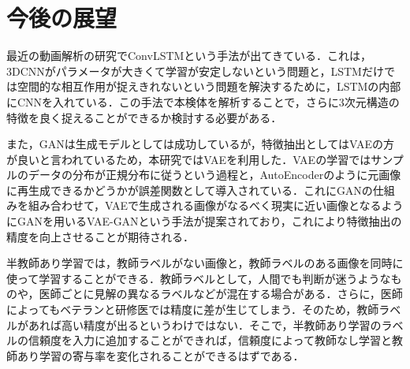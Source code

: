 \section{今後の展望}
最近の動画解析の研究でConvLSTMという手法が出てきている\cite{要出典}．これは，3DCNNがパラメータが大きくて学習が安定しないという問題と，LSTMだけでは空間的な相互作用が捉えきれないという問題を解決するために，LSTMの内部にCNNを入れている．この手法で本検体を解析することで，さらに3次元構造の特徴を良く捉えることができるか検討する必要がある．

また，GANは生成モデルとしては成功しているが，特徴抽出としてはVAEの方が良いと言われているため，本研究ではVAEを利用した．VAEの学習ではサンプルのデータの分布が正規分布に従うという過程と，AutoEncoderのように元画像に再生成できるかどうかが誤差関数として導入されている．これにGANの仕組みを組み合わせて，VAEで生成される画像がなるべく現実に近い画像となるようにGANを用いるVAE-GANという手法が提案されており，これにより特徴抽出の精度を向上させることが期待される\cite{要出典}．

半教師あり学習では，教師ラベルがない画像と，教師ラベルのある画像を同時に使って学習することができる．教師ラベルとして，人間でも判断が迷うようなものや，医師ごとに見解の異なるラベルなどが混在する場合がある．さらに，医師によってもベテランと研修医では精度に差が生じてしまう．そのため，教師ラベルがあれば高い精度が出るというわけではない．そこで，半教師あり学習のラベルの信頼度を入力に追加することができれば，信頼度によって教師なし学習と教師あり学習の寄与率を変化されることができるはずである．